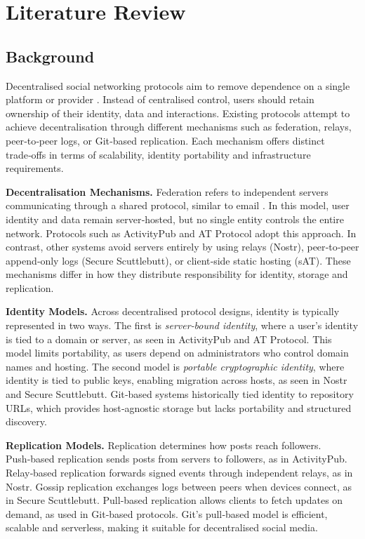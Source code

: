 \section{Literature Review}

\subsection{Background}


Decentralised social networking protocols aim to remove dependence on a single platform or provider \cite{dsnp2026}. Instead of centralised control, users should retain ownership of their identity, data and interactions. Existing protocols attempt to achieve decentralisation through different mechanisms such as federation, relays, peer‑to‑peer logs, or Git‑based replication. Each mechanism offers distinct trade‑offs in terms of scalability, identity portability and infrastructure requirements.

\textbf{Decentralisation Mechanisms.}
Federation refers to independent servers communicating through a shared protocol, similar to email \cite{ngi2026}. In this model, user identity and data remain server‑hosted, but no single entity controls the entire network. Protocols such as ActivityPub and AT Protocol adopt this approach. In contrast, other systems avoid servers entirely by using relays (Nostr), peer‑to‑peer append‑only logs (Secure Scuttlebutt), or client‑side static hosting (sAT). These mechanisms differ in how they distribute responsibility for identity, storage and replication.

\textbf{Identity Models.}
Across decentralised protocol designs, identity is typically represented in two ways. The first is \textit{server‑bound identity}, where a user’s identity is tied to a domain or server, as seen in ActivityPub and AT Protocol. This model limits portability, as users depend on administrators who control domain names and hosting. The second model is \textit{portable cryptographic identity}, where identity is tied to public keys, enabling migration across hosts, as seen in Nostr and Secure Scuttlebutt. Git‑based systems historically tied identity to repository URLs, which provides host‑agnostic storage but lacks portability and structured discovery.

\textbf{Replication Models.}
Replication determines how posts reach followers. Push‑based replication sends posts from servers to followers, as in ActivityPub. Relay‑based replication forwards signed events through independent relays, as in Nostr. Gossip replication exchanges logs between peers when devices connect, as in Secure Scuttlebutt. Pull‑based replication allows clients to fetch updates on demand, as used in Git‑based protocols. Git’s pull‑based model is efficient, scalable and serverless, making it suitable for decentralised social media.


